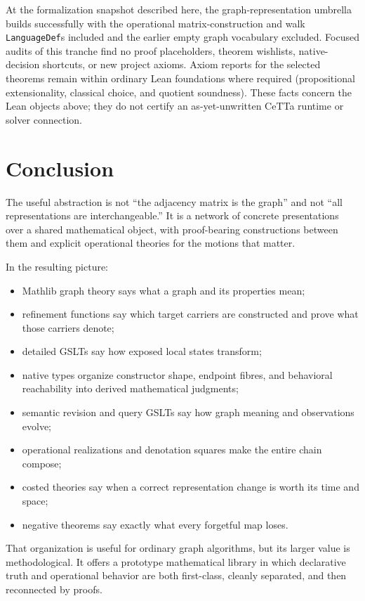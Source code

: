 \documentclass[11pt]{article}
\theoremstyle{remark}
\newcommand{\code}[1]{\texttt{#1}}
\begin{document}
At the formalization snapshot described here, the graph-representation umbrella
builds successfully with the operational matrix-construction and walk
\code{LanguageDef}s included and the earlier empty graph vocabulary excluded.
Focused audits of this tranche
find no proof placeholders, theorem wishlists, native-decision shortcuts, or
new project axioms.  Axiom reports for the selected theorems remain within
ordinary Lean foundations where required (propositional extensionality,
classical choice, and quotient soundness).  These facts concern the Lean
objects above; they do not certify an as-yet-unwritten CeTTa runtime or solver
connection.

\section{Conclusion}

The useful abstraction is not ``the adjacency matrix is the graph'' and not
``all representations are interchangeable.''  It is a network of concrete
presentations over a shared mathematical object, with proof-bearing
constructions between them and explicit operational theories for the motions
that matter.

In the resulting picture:
\begin{itemize}[leftmargin=2em]
  \item Mathlib graph theory says what a graph and its properties mean;
  \item refinement functions say which target carriers are constructed and
        prove what those carriers denote;
  \item detailed GSLTs say how exposed local states transform;
  \item native types organize constructor shape, endpoint fibres, and
        behavioral reachability into derived mathematical judgments;
  \item semantic revision and query GSLTs say how graph meaning and
        observations evolve;
  \item operational realizations and denotation squares make the entire chain
        compose;
  \item costed theories say when a correct representation change is worth its
        time and space;
  \item negative theorems say exactly what every forgetful map loses.
\end{itemize}
That organization is useful for ordinary graph algorithms, but its larger
value is methodological.  It offers a prototype mathematical library in which
declarative truth and operational behavior are both first-class, cleanly
separated, and then reconnected by proofs.
\end{document}
